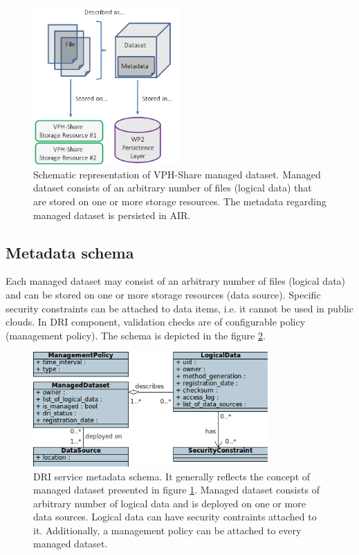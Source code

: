 \begin{figure}[h!]
	\centering
	\includegraphics[width=0.5\textwidth]{images/managed-dataset.png}
	\caption{Schematic representation of VPH-Share managed dataset. Managed
	dataset consists of an arbitrary number of files (logical data) that are stored
	on one or more storage resources. The metadata regarding managed dataset is persisted
	in AIR.}
	\label{fig:managed-dataset}
\end{figure}

\subsection{Metadata schema}
Each managed dataset may consist of an arbitrary number of files (logical 
data) and can be stored on one or more storage resources (data source).
Specific security constraints can be attached to data items, i.e. it cannot be
used in public clouds. In DRI component, validation checks are of configurable
policy (management policy). The schema is depicted in the figure 
\ref{fig:data-model}.\\

\begin{figure}[h!]
	\centering
	\includegraphics[width=0.8\textwidth]{images/data-model.png}
	\caption{DRI service metadata schema. It generally reflects the concept of
	managed dataset presented in figure \ref{fig:managed-dataset}. Managed dataset
	consists of arbitrary number of logical data and is deployed on one or more
	data sources. Logical data can have security contraints attached to it. Additionally,
	a management policy can be attached to every managed dataset.}
	\label{fig:data-model}
\end{figure}

